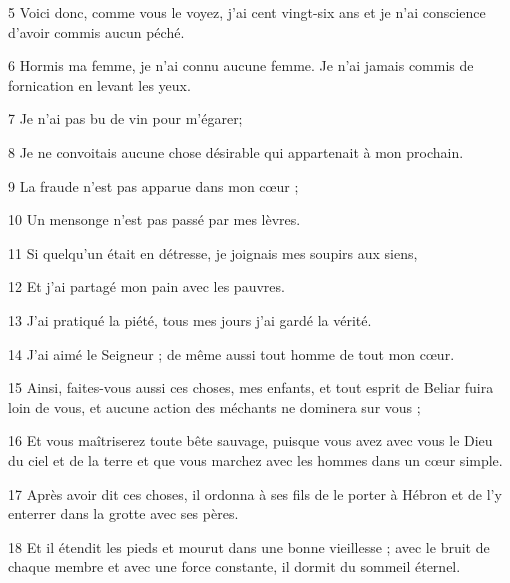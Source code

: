 \par 5 Voici donc, comme vous le voyez, j'ai cent vingt-six ans et je n'ai conscience d'avoir commis aucun péché.

\par 6 Hormis ma femme, je n'ai connu aucune femme. Je n'ai jamais commis de fornication en levant les yeux.

\par 7 Je n'ai pas bu de vin pour m'égarer;

\par 8 Je ne convoitais aucune chose désirable qui appartenait à mon prochain.

\par 9 La fraude n'est pas apparue dans mon cœur ;

\par 10 Un mensonge n'est pas passé par mes lèvres.

\par 11 Si quelqu'un était en détresse, je joignais mes soupirs aux siens,

\par 12 Et j'ai partagé mon pain avec les pauvres.

\par 13 J'ai pratiqué la piété, tous mes jours j'ai gardé la vérité.

\par 14 J'ai aimé le Seigneur ; de même aussi tout homme de tout mon cœur.

\par 15 Ainsi, faites-vous aussi ces choses, mes enfants, et tout esprit de Beliar fuira loin de vous, et aucune action des méchants ne dominera sur vous ;

\par 16 Et vous maîtriserez toute bête sauvage, puisque vous avez avec vous le Dieu du ciel et de la terre et que vous marchez avec les hommes dans un cœur simple.

\par 17 Après avoir dit ces choses, il ordonna à ses fils de le porter à Hébron et de l'y enterrer dans la grotte avec ses pères.

\par 18 Et il étendit les pieds et mourut dans une bonne vieillesse ; avec le bruit de chaque membre et avec une force constante, il dormit du sommeil éternel.



